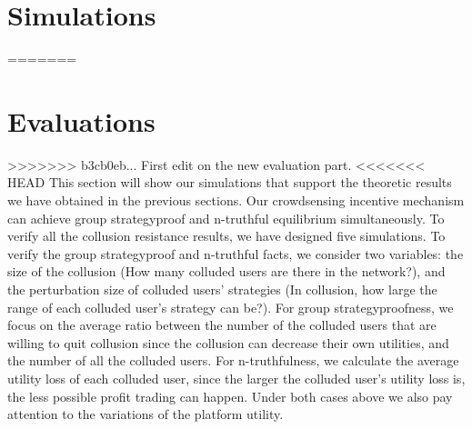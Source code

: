 \documentclass[conference]{IEEEtran}
\theoremstyle{definition}
\begin{document}
\section{Simulations}
=======
{\color{blue}
\section{Evaluations}
>>>>>>> b3cb0eb... First edit on the new evaluation part.
\label{sec:sim}
<<<<<<< HEAD
This section will show our simulations that support the theoretic results we have obtained in the previous sections. Our crowdsensing incentive mechanism can achieve group strategyproof and n-truthful equilibrium simultaneously. 
To verify all the collusion resistance results, we have designed five simulations. To verify the group strategyproof and n-truthful facts, we consider two variables: the size of the collusion (How many colluded users are there in the network?), and the perturbation size of colluded users' strategies (In collusion, how large the range of each colluded user's strategy can be?). For group strategyproofness, we focus on the average ratio between the number of the colluded users that are willing to quit collusion since the collusion can decrease their own utilities, and the number of all the colluded users. For n-truthfulness, we calculate the average utility loss of each colluded user, since the larger the colluded user's utility loss is, the less possible profit trading can happen. Under both cases above we also pay attention to the variations of the platform utility. %

}
\end{document}
